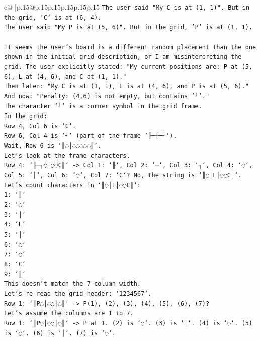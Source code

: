 \documentclass{article}
\begin{document}
{\begin{supertabular}{c@{$\;$}|p{.15\linewidth}@{}p{.15\linewidth}p{.15\linewidth}p{.15\linewidth}p{.15\linewidth}p{.15\linewidth}}
{{{\texttt{The user said "My C is at (1, 1)". But in the grid, 'C' is at (6, 4).} \\
\texttt{The user said "My P is at (5, 6)". But in the grid, 'P' is at (1, 1).} \\
\\ 
\texttt{It seems the user's board is a different random placement than the one shown in the initial grid description, or I am misinterpreting the grid. The user explicitly stated: "My current positions are: P at (5, 6), L at (4, 6), and C at (1, 1)."} \\
\texttt{Then later: "My C is at (1, 1), L is at (4, 6), and P is at (5, 6)."} \\
\texttt{And now: "Penalty: (4,6) is not empty, but contains '┘'."} \\
\texttt{The character '┘' is a corner symbol in the grid frame.} \\
\texttt{In the grid:} \\
\texttt{Row 4, Col 6 is 'C'.} \\
\texttt{Row 6, Col 4 is '┘' (part of the frame `╟─┼─┘`).} \\
\texttt{Wait, Row 6 is `║◌│◌◌◌◌◌║`.} \\
\texttt{Let's look at the frame characters.} \\
\texttt{Row 4: `╟─┐◌│◌◌C║` {-}> Col 1: `╟`, Col 2: `─`, Col 3: `┐`, Col 4: `◌`, Col 5: `│`, Col 6: `◌`, Col 7: `C`? No, the string is `║◌│L│◌◌C║`.} \\
\texttt{Let's count characters in `║◌│L│◌◌C║`:} \\
\texttt{1: `║`} \\
\texttt{2: `◌`} \\
\texttt{3: `│`} \\
\texttt{4: `L`} \\
\texttt{5: `│`} \\
\texttt{6: `◌`} \\
\texttt{7: `◌`} \\
\texttt{8: `C`} \\
\texttt{9: `║`} \\
\texttt{This doesn't match the 7 column width.} \\
\texttt{Let's re{-}read the grid header: `1234567`.} \\
\texttt{Row 1: `║P◌│◌◌│◌║` {-}> P(1), (2), (3), (4), (5), (6), (7)?} \\
\texttt{Let's assume the columns are 1 to 7.} \\
\texttt{Row 1: `║P◌│◌◌│◌║` {-}> P at 1. (2) is `◌`. (3) is `│`. (4) is `◌`. (5) is `◌`. (6) is `│`. (7) is `◌`.} \\
}}}
\end{supertabular}}
\end{document}
